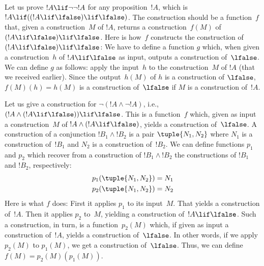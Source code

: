 \documentclass[../../../include/open-logic-section]{subfiles}
\begin{document}
\begin{ex}
Let us prove $!A \lif \lnot \lnot !A$ for any proposition~$!A$, which
is $!A \lif ((!A \lif \lfalse) \lif \lfalse)$. The construction should
be a function~$f$ that, given a construction~$M$ of $!A$, returns a
construction~$f(M)$ of $(!A \lif \lfalse) \lif \lfalse$. Here is
how~$f$ constructs the construction of $(!A \lif \lfalse) \lif
\lfalse$: We have to define a function $g$ which, when given a
construction~$h$ of $!A \lif \lfalse$ as input, outputs a construction
of~$\lfalse$. We can define $g$ as follows: apply the input~$h$ to the
construction~$M$ of $!A$ (that we received earlier). Since the
output~$h(M)$ of $h$ is a construction of $\lfalse$, $f(M)(h) = h(M)$ is a
construction of~$\lfalse$ if $M$ is a construction of~$!A$.
\end{ex}

\begin{ex}
Let us give a construction for $\lnot(!A \land \lnot !A)$, i.e., $(!A
\land (!A \lif \lfalse)) \lif \lfalse$. This is a function~$f$ which,
given as input a construction~$M$ of $!A \land (!A \lif \lfalse)$,
yields a construction of~$\lfalse$. A construction of a conjunction
$!B_1 \land !B_2$ is a pair $\tuple{N_1, N_2}$ where $N_1$ is a
construction of~$!B_1$ and $N_2$ is a construction of~$!B_2$. We can
define functions $p_1$ and $p_2$ which recover from a construction of
$!B_1 \land !B_2$ the constructions of $!B_1$ and $!B_2$, respectively:
\begin{align*}
  p_1(\tuple{N_1, N_2}) &= N_1\\
  p_2(\tuple{N_1, N_2}) &= N_2
\end{align*}
Here is what $f$ does: First it applies $p_1$ to its input~$M$. That
yields a construction of~$!A$. Then it applies $p_2$ to~$M$, yielding
a construction of~$!A \lif \lfalse$. Such a construction, in turn, is
a function~$p_2(M)$ which, if given as input a construction of~$!A$,
yields a construction of~$\lfalse$. In other words, if we apply
$p_2(M)$ to $p_1(M)$, we get a construction of~$\lfalse$.  Thus, we
can define $f(M) = p_2(M)(p_1(M))$.
\end{ex}
\end{document}
